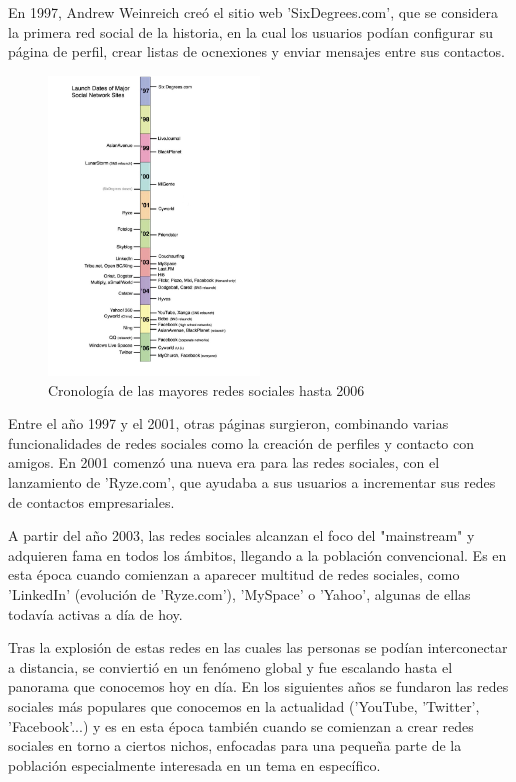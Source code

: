 En 1997, Andrew Weinreich creó el sitio web 'SixDegrees.com', que se considera la primera red social de la historia, en la cual los usuarios podían configurar su página de perfil, crear listas de ocnexiones y enviar mensajes entre sus contactos.

\begin{figure}[h]
	\centering
	\includegraphics[width = 0.5\textwidth]{Imagenes/Vectorial/cronologiaRRSS.pdf}
	\caption{Cronología de las mayores redes sociales hasta 2006 \citep{10.1111/j.1083-6101.2007.00393.x}}
	\label{fig:cronologiaRRSS}
\end{figure}

Entre el año 1997 y el 2001, otras páginas surgieron, combinando varias funcionalidades de redes sociales como la creación de perfiles y contacto con amigos. En 2001 comenzó una nueva era para las redes sociales, con el lanzamiento de 'Ryze.com', que ayudaba a sus usuarios a incrementar sus redes de contactos empresariales.

A partir del año 2003, las redes sociales alcanzan el foco del "mainstream" y adquieren fama en todos los ámbitos, llegando a la población convencional. Es en esta época cuando comienzan a aparecer multitud de redes sociales, como 'LinkedIn' (evolución de 'Ryze.com'), 'MySpace' o 'Yahoo', algunas de ellas todavía activas a día de hoy.

Tras la explosión de estas redes en las cuales las personas se podían interconectar a distancia, se conviertió en un fenómeno global y fue escalando hasta el panorama que conocemos hoy en día. En los siguientes años se fundaron las redes sociales más populares que conocemos en la actualidad ('YouTube, 'Twitter', 'Facebook'...) y es en esta época también cuando se comienzan a crear redes sociales en torno a ciertos nichos, enfocadas para una pequeña parte de la población especialmente interesada en un tema en específico.

